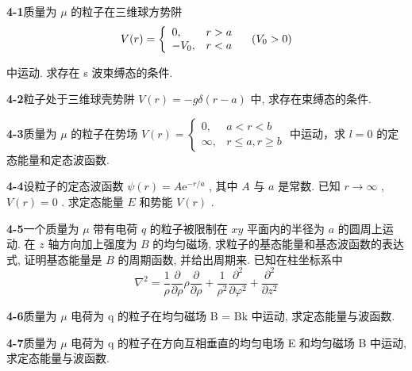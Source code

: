 \textbf{4-1}\quad 质量为 $\mu$ 的粒子在三维球方势阱
$$
V (r) = \left\{ \begin{array}{l l} 0, & r > a \\ - V _ {0}, & r <   a \end{array} \right. \quad (V _ {0} > 0)
$$

中运动. 求存在 s 波束缚态的条件.

\vfill

\newpage
\vfill

\noindent
\textbf{4-2}\quad 粒子处于三维球壳势阱 $V(r) = -g\delta(r - a)$ 中, 求存在束缚态的条件.

\vfill

\newpage
\vfill

\noindent
\textbf{4-3}\quad 质量为 $\mu$ 的粒子在势场 $V(r) = \left\{ \begin{array}{ll}0, & a < r < b\\ \infty , & r\leqslant a,r\geqslant b \end{array} \right.$ 中运动，求 $l = 0$ 的定态能量和定态波函数.

\vfill

\newpage
\vfill

\noindent
\textbf{4-4}\quad 设粒子的定态波函数 $\psi(r) = A\mathrm{e}^{-r / a}$ , 其中 $A$ 与 $a$ 是常数. 已知 $r \to \infty$ , $V(r) = 0$ . 求定态能量 $E$ 和势能 $V(r)$ .

\vfill

\newpage
\vfill

\noindent
\textbf{4-5}\quad 一个质量为 $\mu$ 带有电荷 $q$ 的粒子被限制在 $xy$ 平面内的半径为 $a$ 的圆周上运动. 在 $z$ 轴方向加上强度为 $B$ 的均匀磁场, 求粒子的基态能量和基态波函数的表达式, 证明基态能量是 $B$ 的周期函数, 并给出周期来. 已知在柱坐标系中
\begin{equation*}
\nabla^ {2} = \frac {1}{\rho} \frac {\partial}{\partial \rho} \rho \frac {\partial}{\partial \rho} + \frac {1}{\rho^ {2}} \frac {\partial^ {2}}{\partial \varphi^ {2}} + \frac {\partial^ {2}}{\partial z ^ {2}}
\end{equation*}

\vfill

\newpage
\vfill

\noindent
\textbf{4-6}\quad 质量为 $\mu$ 电荷为 q 的粒子在均匀磁场 B = Bk 中运动, 求定态能量与波函数.

\vfill

\newpage
\vfill

\noindent
\textbf{4-7}\quad 质量为 $\mu$ 电荷为 q 的粒子在方向互相垂直的均匀电场 E 和均匀磁场 B 中运动, 求定态能量与波函数.

